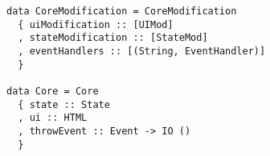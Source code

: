 \begin{verbatim}
data CoreModification = CoreModification
  { uiModification :: [UIMod]
  , stateModification :: [StateMod]
  , eventHandlers :: [(String, EventHandler)]
  }

data Core = Core
  { state :: State
  , ui :: HTML
  , throwEvent :: Event -> IO ()
  }
\end{verbatim}
